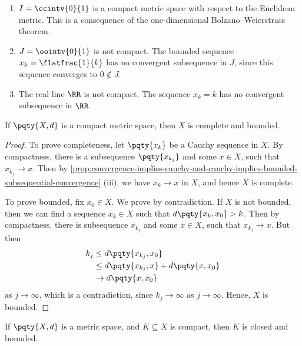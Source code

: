 \begin{example}
    \begin{enumerate}[label=(\roman*)]
        \item \(I = \ccintv{0}{1}\) is a compact metric space with respect to the Euclidean metric. This is a consequence of the one-dimensional Bolzano--Weierstrass theorem.
        \item \(J = \oointv{0}{1}\) is not compact. The bounded sequence \(x_k = \flatfrac{1}{k}\) has no convergent subsequence in \(J\), since this sequence converges to \(0 \notin J\).
        \item The real line \(\RR\) is not compact. The sequence \(x_k = k\) has no convergent subsequence in \(\RR\).
    \end{enumerate}
\end{example}

\begin{theorem}
    \label{thm:compact-metric-spaces-are-complete-and-bounded}%
    If \(\pqty{X, d}\) is a compact metric space, then \(X\) is complete and bounded.
\end{theorem}

\begin{proof}
    To prove completeness, let \(\pqty{x_k}\) be a Cauchy sequence in \(X\). By compactness, there is a subsequence \(\pqty{x_{k_j}}\) and some \(x \in X\), such that \(x_{k_j} \to x\). Then by \autoref{prop:convergence-implies-cauchy-and-cauchy-implies-bounded-subsequential-convergence} (iii), we have \(x_k \to x\) in \(X\), and hence \(X\) is complete.

    To prove bounded, fix \(x_0 \in X\). We prove by contradiction. If \(X\) is not bounded, then we can find a sequence \(x_k \in X\) such that \(d\pqty{x_k, x_0} > k\). Then by compactness, there is subsequence \(x_{k_j}\) and some \(x \in X\), such that \(x_{k_j} \to x\). But then
    \begin{align*}
        k_j & \leq d\pqty{x_{k_j}, x_0} \\
        & \leq d\pqty{x_{k_j}, x} + d\pqty{x, x_0} \\
        & \to d\pqty{x, x_0}
    \end{align*}
    as \(j \to \infty\), which is a contradiction, since \(k_j \to \infty\) as \(j \to \infty\). Hence, \(X\) is bounded.
\end{proof}

\begin{theorem}
    \label{thm:compact-subsets-of-metric-spaces-are-closed-and-bounded}%
    If \(\pqty{X, d}\) is a metric space, and \(K \subseteq X\) is compact, then \(K\) is closed and bounded.
\end{theorem}

